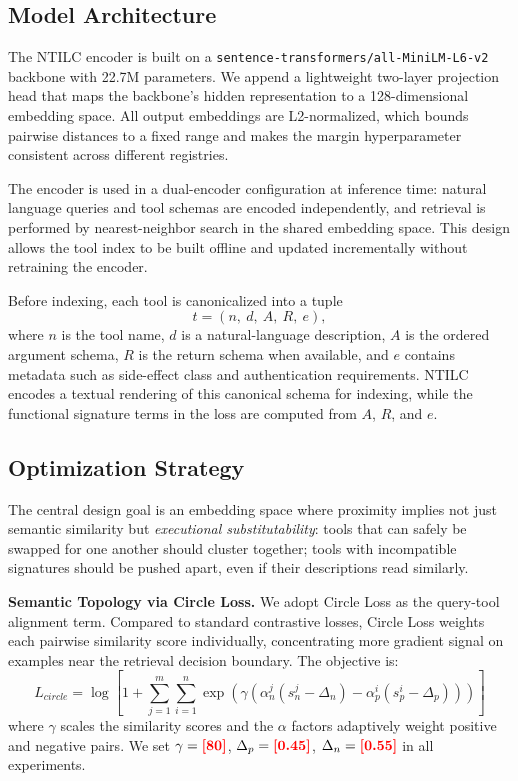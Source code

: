 \documentclass{article}
\newcommand{\placeholder}[1]{\textcolor{red}{\textbf{[#1]}}}
\begin{document}
\subsection{Model Architecture}
\label{sec:arch}

The NTILC encoder is built on a \texttt{sentence-transformers/all-MiniLM-L6-v2} backbone with 22.7M parameters.
We append a lightweight two-layer projection head that maps the backbone's hidden representation to a 128-dimensional embedding space.
All output embeddings are L2-normalized, which bounds pairwise distances to a fixed range and makes the margin hyperparameter consistent across different registries.

The encoder is used in a dual-encoder configuration at inference time: natural language queries and tool schemas are encoded independently, and retrieval is performed by nearest-neighbor search in the shared embedding space.
This design allows the tool index to be built offline and updated incrementally without retraining the encoder.

Before indexing, each tool is canonicalized into a tuple
\begin{equation}
    t = (n,\ d,\ A,\ R,\ e),
\end{equation}
where $n$ is the tool name, $d$ is a natural-language description, $A$ is the ordered argument schema, $R$ is the return schema when available, and $e$ contains metadata such as side-effect class and authentication requirements.
NTILC encodes a textual rendering of this canonical schema for indexing, while the functional signature terms in the loss are computed from $A$, $R$, and $e$.

\subsection{Optimization Strategy}

The central design goal is an embedding space where proximity implies not just semantic similarity but \textit{executional substitutability}: tools that can safely be swapped for one another should cluster together; tools with incompatible signatures should be pushed apart, even if their descriptions read similarly.

\textbf{Semantic Topology via Circle Loss.}
We adopt Circle Loss \cite{sun2020circlelossunifiedperspective} as the query-tool alignment term.
Compared to standard contrastive losses, Circle Loss weights each pairwise similarity score individually, concentrating more gradient signal on examples near the retrieval decision boundary.
The objective is:
\begin{equation}
    L_{circle} = \log \left[ 1 + \sum_{j=1}^m \sum_{i=1}^n \exp\left(\gamma (\alpha_n^j (s_n^j - \Delta_n) - \alpha_p^i (s_p^i - \Delta_p))\right) \right]
\end{equation}
where $\gamma$ scales the similarity scores and the $\alpha$ factors adaptively weight positive and negative pairs.
We set $\gamma = \placeholder{80}$, $\Delta_p = \placeholder{0.45}$, $\Delta_n = \placeholder{0.55}$ in all experiments.
\end{document}
